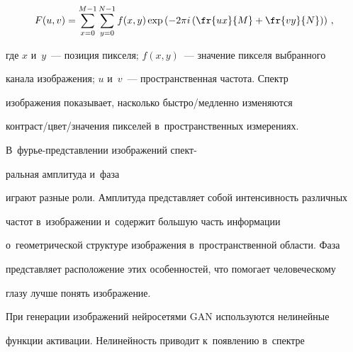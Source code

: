 \noindent


  \begin{equation*}


  F(u,v)= \sum\limits_{x=0}^{M-1} \sum\limits_{y=0}^{N-1} f(x,y) \exp \left( -


2\pi  i \left( \fr{ux}{M} +\fr{vy}{N}\right)\right)\,,




  \end{equation*}


  


  \vspace*{-3pt}


  


  \noindent


где $x$ и~$y$~--- позиция пикселя; $f(x, y)$~--- значение пикселя выбранного 


канала изображения; $u$ и~$v$~--- пространственная частота. Спектр 


изображения показывает, насколько быст\-ро\!/\!мед\-лен\-но изменяются  


кон\-траст\!/\!цвет\!/\!зна\-че\-ния пикселей в~пространственных измерениях. 


В~фурье-пред\-став\-ле\-нии изображений спект-\linebreak\vspace*{-12pt}





\pagebreak





\noindent


раль\-ная амплитуда и~фаза 


играют разные роли. Амплитуда представляет собой интенсивность различных 


частот в~изображении и~содержит большую часть информации 


о~геометрической структуре изображения в~пространственной области. Фаза 


представляет расположение этих особенностей, что помогает человеческому 


глазу лучше понять изображение. 


  


  При генерации изображений нейросетями GAN используются нелинейные 


функции активации. Нелинейность приводит к~появлению в~спектре 


